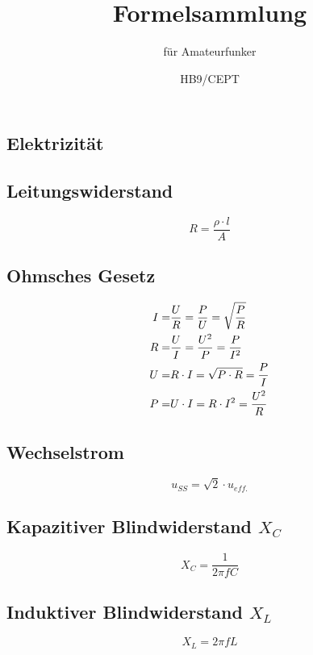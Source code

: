 \documentclass[10pt,landscape]{scrartcl}
\author{HB9/CEPT}
\date{}
\title{Formelsammlung}
\subtitle{f\"ur Amateurfunker}
\begin{document}
\setlength{\columnsep}{1cm}
\begin{multicols}{3}

\maketitle

\section{Elektrizität}

\noindent
{}

\subsection*{Leitungswiderstand}

$$ R = \frac{\rho \cdot l}{A} $$

\subsection*{Ohmsches Gesetz}

\begin{align*}
I =& \frac{U}{R} = \frac{P}{U} = \sqrt{P \over R} \\
R =& \frac{U}{I} = \frac{U^2}{P} = \frac{P}{I^2} \\
U =& R \cdot I = \sqrt{P\cdot R} = \frac{P}{I} \\
P =& U \cdot I = R \cdot I^2 = \frac{U^2}{R}
\end{align*}

\subsection*{Wechselstrom}

$$ u_{SS} = \sqrt{2}\cdot u_{eff.} $$

\subsection*{Kapazitiver Blindwiderstand $X_C$}
$$ X_C = \frac{1}{2 \pi f C} $$

\subsection*{Induktiver Blindwiderstand $X_L$}
$$ X_L = 2 \pi f L $$


\end{multicols}
\end{document}

